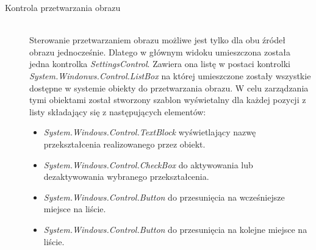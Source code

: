 \documentclass[a4paper,11pt,twoside]{report}
\theoremstyle{definition}
\begin{document}
\begin{description}
\pagebreak
\item [Kontrola przetwarzania obrazu] \hfill \\
Sterowanie przetwarzaniem obrazu możliwe jest tylko dla obu źródeł obrazu jednocześnie. Dlatego w głównym widoku umieszczona została jedna kontrolka \textit{SettingsControl}. Zawiera ona listę w postaci kontrolki \textit{System.Windonws.Control.ListBox} na której umieszczone zostały wszystkie dostępne w systemie obiekty do przetwarzania obrazu. W celu zarządzania tymi obiektami został stworzony szablon wyświetalny dla każdej pozycji z listy składający się z następujących elementów:

\begin{itemize}
\item \textit{System.Windows.Control.TextBlock} wyświetlający nazwę przekształcenia realizowanego przez obiekt.
\item \textit{System.Windows.Control.CheckBox} do aktywowania lub dezaktywowania wybranego przekształcenia.
\item \textit{System.Windows.Control.Button} do przesunięcia na wcześniejsze miejsce na liście.
\item \textit{System.Windows.Control.Button} do przesunięcia na kolejne miejsce na liście.
\end{itemize}


\end{description}
\end{document}

